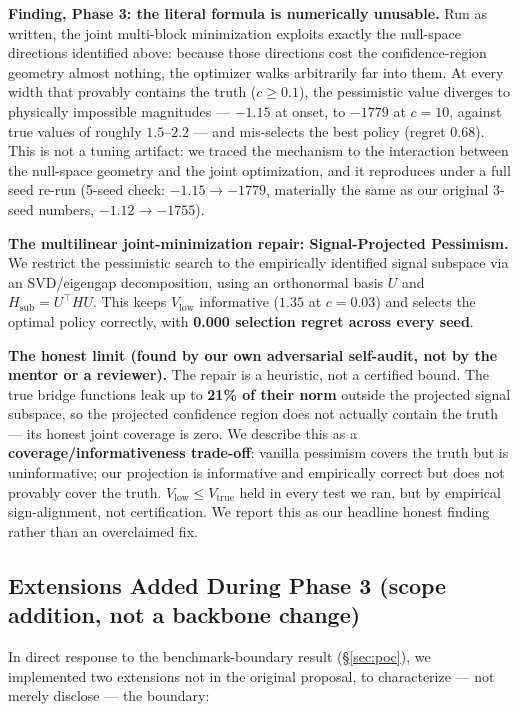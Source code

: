 \documentclass[11pt]{article}
\begin{document}
\textbf{Finding, Phase 3: the literal formula is numerically unusable.} Run as written, the
joint multi-block minimization exploits exactly the null-space directions identified
above: because those directions cost the confidence-region geometry almost nothing, the
optimizer walks arbitrarily far into them. At every width that provably contains the truth
($c \ge 0.1$), the pessimistic value diverges to physically impossible magnitudes ---
$-1.15$ at onset, to $-1779$ at $c=10$, against true values of roughly $1.5$--$2.2$ --- and
mis-selects the best policy (regret $0.68$). This is not a tuning artifact: we traced the
mechanism to the interaction between the null-space geometry and the joint optimization,
and it reproduces under a full seed re-run (5-seed check: $-1.15\to-1779$, materially the
same as our original 3-seed numbers, $-1.12\to-1755$).

\textbf{The multilinear joint-minimization repair: Signal-Projected Pessimism.} We restrict
the pessimistic search to the empirically identified signal subspace via an SVD/eigengap
decomposition, using an orthonormal basis $U$ and $H_{\mathrm{sub}} = U^\top H U$. This
keeps $V_{\mathrm{low}}$ informative ($1.35$ at $c=0.03$) and selects the optimal policy
correctly, with \textbf{0.000 selection regret across every seed}.

\textbf{The honest limit (found by our own adversarial self-audit, not by the mentor or a
reviewer).} The repair is a heuristic, not a certified bound. The true bridge functions
leak up to \textbf{21\% of their norm} outside the projected signal subspace, so the
projected confidence region does not actually contain the truth --- its honest joint
coverage is zero. We describe this as a \textbf{coverage/informativeness trade-off}:
vanilla pessimism covers the truth but is uninformative; our projection is informative and
empirically correct but does not provably cover the truth. $V_{\mathrm{low}} \le
V_{\mathrm{true}}$ held in every test we ran, but by empirical sign-alignment, not
certification. We report this as our headline honest finding rather than an overclaimed
fix.

\subsection{Extensions Added During Phase 3 (scope addition, not a backbone change)}
\label{sec:extensions}

In direct response to the benchmark-boundary result (\S\ref{sec:poc}), we implemented two
extensions not in the original proposal, to characterize --- not merely disclose --- the
boundary:
\end{document}
